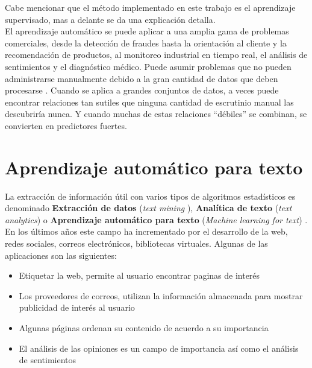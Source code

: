 Cabe mencionar que el método implementado en este trabajo es el aprendizaje supervisado, mas a delante se da una explicación detalla.\\

El aprendizaje automático se puede aplicar a una amplia gama de problemas comerciales, desde la detección de fraudes hasta la orientación al cliente y la recomendación de productos, al monitoreo industrial en tiempo real, el análisis de sentimientos y el diagnóstico médico. Puede asumir problemas que no pueden administrarse manualmente debido a la gran cantidad de datos que deben procesarse \citep{CT22}. Cuando se aplica a grandes conjuntos de datos, a veces puede encontrar relaciones tan sutiles que ninguna cantidad de escrutinio manual las descubriría nunca. Y cuando muchas de estas relaciones ``débiles'' se combinan, se convierten en predictores fuertes.



\section[Aprendizaje automático]{Aprendizaje automático para texto}

La extracción de información útil con varios tipos de algoritmos estadísticos es denominado \textbf{Extracción de datos} (\textit{text mining} ), \textbf{Analítica de texto} (\textit{text analytics}) o \textbf{Aprendizaje automático para texto} (\textit{Machine learning for text}) \citep{CD1}. En los últimos años este campo ha incrementado por el desarrollo de la web, redes sociales, correos electrónicos, bibliotecas virtuales. Algunas de las aplicaciones son las siguientes:

\begin{itemize}

	\item Etiquetar la web, permite al usuario encontrar paginas de interés

	\item Los proveedores de correos, utilizan la información almacenada para mostrar publicidad de interés al usuario

	\item Algunas páginas ordenan su contenido de acuerdo a su importancia

	\item El análisis de las opiniones es un campo de importancia así como el análisis de sentimientos		

\end{itemize}

